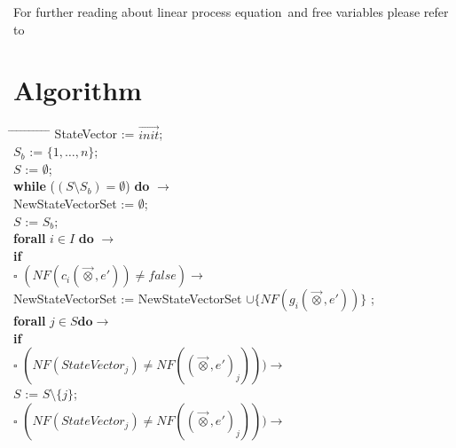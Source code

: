 \documentclass[a4paper,10pt]{article}
\newcommand{\lpe}{linear process equation}
\newcommand{\ovr}{\overrightarrow}
\newcommand{\tb}{\textbf}
\newcommand{\ra}{$\rightarrow$}
\newcommand{\sq}{$\square$}
\begin{document}
For further reading about \lpe\ and free variables please refer to \cite{LPEfreevar} 
\newpage
\section{Algorithm} \label{sec:alg}
\begin{tabbing} 
\hspace*{5.mm} \= \hspace*{5.mm} \= \hspace*{5.mm} \= \hspace*{5.mm} \= \hspace*{5.mm} \= \hspace*{5.mm}  \= \hspace*{5.mm}  \= \hspace*{5.mm}  \= \hspace*{5.mm} \= \hspace*{5.mm} \= \hspace*{5.mm}\kill
StateVector := $\ovr{init}$; \\
$S_b$ := $\lbrace 1, \ldots, n \rbrace$; \\
$S$ := $\emptyset$;\\ 
\tb{while}  ($ (S \setminus S_b) = \emptyset $) \tb{do} \ra \\
  \> NewStateVectorSet := $\emptyset$;\\
  \> $S$ := $S_b$; \\
  \> \tb{forall} $i \in I$ \tb{do} \ra \\
  \>	\>	\tb{if} \\
  \>	\>	\sq \> $(NF(c_i(\ovr{\otimes},e')) \not= false) \rightarrow$ \\
  \>	\>	\> 	\>NewStateVectorSet := NewStateVectorSet $\cup \lbrace NF(g_i(\ovr{\otimes},e')) \rbrace$ ;\\  
  \>	\>	\>  	\>  \tb{forall} $j \in S \tb{do} \rightarrow$ \\
  \>	\>	\>  	\>	\>  	    \tb{if} \\
  \>	\>	\>  	\>   	\>         $\square$  \> $(NF(StateVector_j) \neq NF((\ovr{\otimes}, e')_j))) \rightarrow$ \\
  \>	\>	\>  	\>    	\>       \>    \>            $S$ := $S\setminus \lbrace j \rbrace$;\\
  \>	\>	\>  	\>    	\>        $\square$ \> $ (NF(StateVector_j) \neq NF((\ovr{\otimes}, e')_j))) \rightarrow$\\

\end{tabbing}
\end{document}
